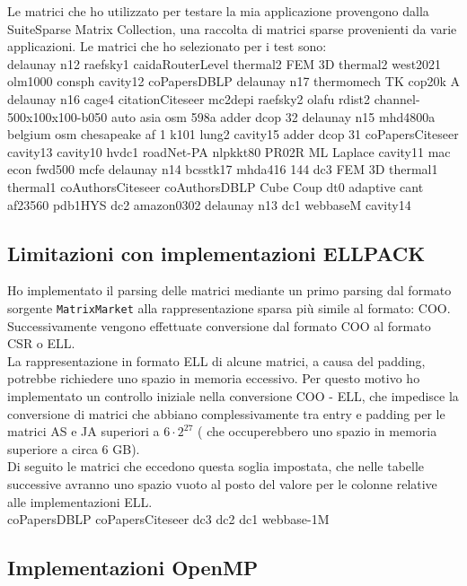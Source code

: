 \documentclass[acmsmall,nonacm=true]{acmart}
\newcommand{\vvv}[1]{{\small\texttt{#1}}}
\begin{document}
Le matrici che ho utilizzato per testare la mia applicazione provengono dalla 
SuiteSparse Matrix Collection, una raccolta di matrici sparse provenienti da varie applicazioni.
Le matrici che ho selezionato per i test sono:\\
delaunay n12	 raefsky1	 caidaRouterLevel	 thermal2	 FEM 3D thermal2	 west2021	 olm1000	 consph	 cavity12	 coPapersDBLP	 delaunay n17	 thermomech TK	 cop20k A	 delaunay n16	 cage4	 citationCiteseer	 mc2depi	 raefsky2	 olafu	 rdist2	 channel-500x100x100-b050	auto	 asia osm	 598a	 adder dcop 32	 delaunay n15	 mhd4800a	 belgium osm	 chesapeake	 af 1 k101	 lung2	 cavity15	 adder dcop 31	 coPapersCiteseer	 cavity13	 cavity10	 hvdc1	 roadNet-PA	 nlpkkt80	 PR02R	 ML Laplace	 cavity11	 mac econ fwd500	 mcfe	 delaunay n14	 bcsstk17	 mhda416	 144	 dc3	 FEM 3D thermal1	 thermal1	 coAuthorsCiteseer	 coAuthorsDBLP	 Cube Coup dt0	 adaptive	 cant	 af23560	 pdb1HYS	 dc2	 amazon0302	 delaunay n13	 dc1	 webbaseM	 cavity14
\\

\subsection{Limitazioni con implementazioni ELLPACK}
Ho implementato il parsing delle matrici mediante un primo parsing dal formato sorgente
\vvv{MatrixMarket} alla rappresentazione sparsa più simile al formato: COO.\\
Successivamente vengono effettuate conversione dal formato COO al formato CSR o ELL.\\

La rappresentazione in formato ELL di alcune matrici, a causa del padding, potrebbe richiedere 
uno spazio in memoria eccessivo. Per questo motivo ho implementato un controllo iniziale nella 
conversione COO - ELL, che impedisce la conversione di matrici che abbiano complessivamente tra 
entry e padding per le matrici AS e JA superiori a $6 \cdot 2^{27}$ 
( che occuperebbero uno spazio in memoria superiore a circa 6 GB).\\
Di seguito le matrici che eccedono questa soglia impostata, che nelle tabelle successive avranno
uno spazio vuoto al posto del valore per le colonne relative alle implementazioni ELL.\\

coPapersDBLP	coPapersCiteseer	dc3	dc2	dc1	webbase-1M\\

\subsection{Implementazioni OpenMP}
\end{document}
